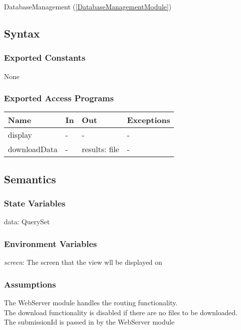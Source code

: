 \documentclass[12pt, titlepage]{article}
\begin{document}
DatabaseManagement (\ref{DatabaseManagementModule})

\subsection{Syntax}

\subsubsection{Exported Constants}

None

\subsubsection{Exported Access Programs}

\begin{center}
\begin{tabular}{p{3cm} p{3cm} p{4cm} p{2cm}}
\hline
\textbf{Name} & \textbf{In} & \textbf{Out} & \textbf{Exceptions} \\
\hline
display & - & - & - \\
downloadData & - & results: file & - \\
\hline
\end{tabular}
\end{center}

\subsection{Semantics}

\subsubsection{State Variables}

data: QuerySet

\subsubsection{Environment Variables}

\textit{screen}: The screen that the view wll be displayed on

\subsubsection{Assumptions}

The WebServer module handles the routing functionality. \\
The download functionality is disabled if there are no files to be downloaded. \\
The submissionId is passed in by the WebServer module
\end{document}
